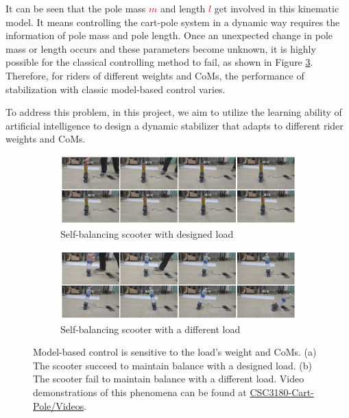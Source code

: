\documentclass[10pt,a4paper]{article}
\begin{document}
	It can be seen that the pole mass \textcolor{red}{$m$} and length \textcolor{red}{$l$} get involved in this kinematic model. It means controlling the cart-pole system in a dynamic way requires the information of pole mass and pole length. Once an unexpected change in pole mass or length occurs and these parameters become unknown, it is highly possible for the classical controlling method to fail, as shown in Figure \ref{fig:different_rider}.
	Therefore, for riders of different weights and CoMs, the performance of stabilization with classic model-based control varies. 
	
	To address this problem, in this project, we aim to utilize the learning ability of artificial intelligence to design a dynamic stabilizer that adapts to different rider weights and CoMs.
	
	
	\begin{figure}
		\centering
		\begin{subfigure}[b]{1\textwidth}
			\centering
			\includegraphics[width=1\linewidth]{figure/success}
			\caption{Self-balancing scooter with designed load}
			\label{fig:success}
		\end{subfigure}
		\hfill
		\begin{subfigure}[b]{1\textwidth}
			\centering
			\includegraphics[width=1\linewidth]{figure/fail}
			\caption{Self-balancing scooter with a different load}
			\label{fig:fail}
		\end{subfigure}
		\caption{Model-based control is sensitive to the load's weight and CoMs. (a) The scooter succeed to maintain balance with a designed load. (b) The scooter fail to maintain balance with a different load. Video demonstrations of this phenomena can be found at \href{https://1drv.ms/f/s!AmutmbT5H6Pkm0sNJx83Q54XewmB?e=HUkzYK}{CSC3180-Cart-Pole/Videos}.}
		\label{fig:different_rider}
	\end{figure}
	
\end{document}
